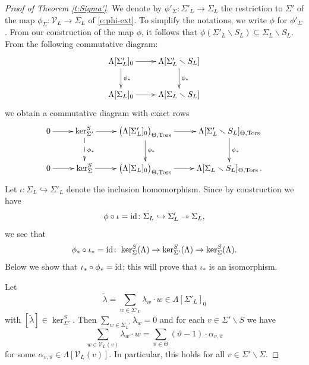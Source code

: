 \documentclass[11pt]{amsart}
\theoremstyle{plain}
\theoremstyle{definition}
\newcommand{\into}{\hookrightarrow}
\newcommand{\onto}{\twoheadrightarrow}
\newcommand{\hs}{\kern 0.8pt}
\newcommand{\id}{{\rm id}}
\newcommand{\V}{{\mathcal V}}
\newcommand{\Tors}{{\rm Tors}}
\newcommand{\Tht}{{\Theta,\Tors}}
\newcommand{\vt}{{\vartheta}}
\newcommand{\lambdatil}{{\tilde\lambda}}
\begin{document}
\begin{proof}[Proof of Theorem \ref{t:Sigma'}]
We denote by $\phi'_\Sigma\colon \Sigma'_L\to\Sigma_L$ the restriction to $\Sigma'$
of the map $\phi_\Sigma \colon \V_L\to \Sigma_L$ of \eqref{e:phi-ext}.
To simplify the notations, we write
$\phi$ for $\phi'_\Sigma$.
From our construction of the map $\phi$, it follows that
$\phi(\Sigma'_L\smallsetminus S_L)\subseteq \Sigma_L\smallsetminus S_L$.
From the following commutative diagram:
\[
\xymatrix{
\Lambda[\Sigma'_L]_0\ar[r]\ar[d]^{\phi_*} &\Lambda[\Sigma'_L\smallsetminus S_L]\ar[d]^{\phi_*}\\
\Lambda[\Sigma_L]_0\ar[r]                &\Lambda[\Sigma_L\smallsetminus S_L]
}
\]
we obtain a commutative diagram with exact rows
\[
\xymatrix{
0\ar[r] &\ker^S_{\Sigma'}\ar@{-->}[d]^{\phi_*}\ar[r]
        &\big(\Lambda[\Sigma'_L]_0\big)_\Tht\ar[r]\ar[d]^{\phi_*}
       &\Lambda[\Sigma'_L\smallsetminus S_L]_\Tht\ar[d]^{\phi_*}\\
0\ar[r] &\ker^S_{\Sigma}\ar[r]&\big(\Lambda[\Sigma_L]_0\big)_\Tht \ar[r]
       &\Lambda[\Sigma_L\smallsetminus S_L]_\Tht\,.
}
\]
Let $\iota\colon \Sigma_L\into \Sigma'_L$ denote the inclusion homomorphism.
Since by construction we have
\[\phi\circ\iota=\id\colon \Sigma_L\into\Sigma'_L\onto\Sigma_L,\]
we see that
\[\phi_*\circ \iota_*=\id\colon\hs \ker^S_\Sigma(\Lambda)\to\ker^S_{\Sigma'}(\Lambda)\to \ker^S_\Sigma(\Lambda).\]
Below we show that $\iota_*\circ\phi_*=\id$;
this will prove that $\iota_*$ is an isomorphism.

Let
\[
\lambdatil=\sum_{w\in \Sigma'_L} \lambda_w\cdot w \in \Lambda[\Sigma'_L]_0
\]
with $[\lambdatil]\in\ker^S_{\Sigma'}$.
Then $\sum_{w\in \Sigma_L'}\lambda_w=0$ and for each $v\in \Sigma'\smallsetminus S$ we have
\[\sum_{w\in \V_L(v)} \lambda_w\cdot w=\sum_{\vt\in\Theta} (\vt-1)\cdot \alpha_{v,\vt}\]
for some $\alpha_{v,\vt}\in \Lambda[\V_L(v)]$.
In particular, this holds for all $v\in\Sigma'\smallsetminus \Sigma$.


\end{proof}
\end{document}

